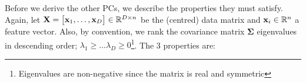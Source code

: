 \documentclass[a4paper]{article}
\begin{document}

Before we derive the other PCs, we describe the properties they must satisfy.
Again, let $\textbf{X} = \begin{bmatrix} \textbf{x}_1,\ldots,\textbf{x}_D \end{bmatrix} \in \mathbb{R}^{D\times n}$ be the (centred) data matrix and $\textbf{x}_i\in\mathbb{R}^n$ a feature vector. Also, by convention, we rank the covariance matrix $\boldsymbol{\Sigma}$ eigenvalues in descending order; $\lambda_1\geq \ldots \lambda_D \geq 0$\footnote{Eigenvalues are non-negative since the matrix is real and symmetric}. The 3 properties are:
\end{document}
